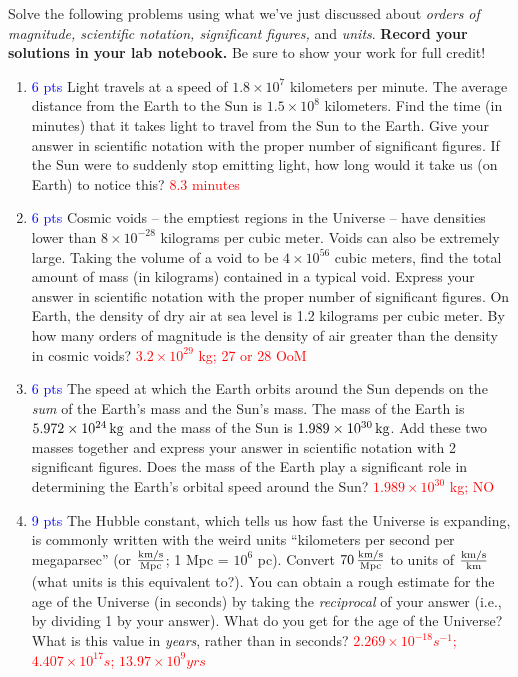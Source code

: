 \documentclass[11pt]{article}
\begin{document}
Solve the following problems using what we've just discussed about \textit{orders of magnitude, scientific notation, significant figures,} and \textit{units}.  \textbf{Record your solutions in your lab notebook.}  Be sure to show your work for full credit!
\begin{enumerate}
    \item \textcolor{blue}{6 pts} Light travels at a speed of $1.8 \times 10^7$ kilometers per minute. The average distance from the Earth to the Sun is $1.5 \times 10^8$ kilometers. Find the time (in minutes) that it takes light to travel from the Sun to the Earth. Give your answer in scientific notation with the proper number of significant figures. If the Sun were to suddenly stop emitting light, how long would it take us (on Earth) to notice this? \textcolor{red}{$8.3$ minutes}
    
    \item \textcolor{blue}{6 pts} Cosmic voids -- the emptiest regions in the Universe -- have densities lower than $8 \times 10^{-28}$ kilograms per cubic meter. Voids can also be extremely large. Taking the volume of a void to be $4 \times 10^{56}$ cubic meters, find the total amount of mass (in kilograms) contained in a typical void. Express your answer in scientific notation with the proper number of significant figures. On Earth, the density of dry air at sea level is 1.2 kilograms per cubic meter. By how many orders of magnitude is the density of air greater than the density in cosmic voids? \textcolor{red}{$3.2 \times 10^{29}$ kg; 27 or 28 OoM}
    
    \item \textcolor{blue}{6 pts} The speed at which the Earth orbits around the Sun depends on the \emph{sum} of the Earth's mass and the Sun's mass. The mass of the Earth is $5.972 \times 10^{24} \, {\rm kg}$ and the mass of the Sun is $1.989 \times 10^{30} \, {\rm kg}$. Add these two masses together and express your answer in scientific notation with 2 significant figures. Does the mass of the Earth play a significant role in determining the Earth's orbital speed around the Sun? \textcolor{red}{$1.989 \times 10^{30}$ kg; NO}

    \item \textcolor{blue}{9 pts} The Hubble constant, which tells us how fast the Universe is expanding, is commonly written with the weird units ``kilometers per second per megaparsec'' (or $\frac{\rm km/s}{\rm Mpc}$; 1 Mpc = $10^6$ pc). Convert $70 \, \frac{\rm km/s}{\rm Mpc}$ to units of $\frac{\rm km/s}{\rm km}$ (what units is this equivalent to?). You can obtain a rough estimate for the age of the Universe (in seconds) by taking the \emph{reciprocal} of your answer (i.e., by dividing 1 by your answer). What do you get for the age of the Universe? What is this value in \emph{years}, rather than in seconds? \textcolor{red}{$2.269 \times 10^{-18} s^{-1}$; $4.407 \times 10^{17} s$; $13.97 \times 10^9 yrs$}
\end{enumerate}
\end{document}
